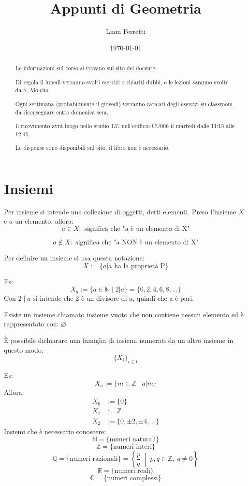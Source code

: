 \documentclass[a4paper,12pt]{article}
\title{Appunti di Geometria}
\author{Liam Ferretti}
\date{\today}
\begin{document}
	
	\maketitle
	
	\begin{abstract}
		Le informazioni sul corso si trovano sul \hyperlink{https://sites.google.com/uniroma1.it/kieranogrady}{sito del docente}.
		
		Di regola il lunedì verranno svolti esercizi o chiariti dubbi, e le lezioni saranno svolte da S. Molcho.
		
		Ogni settimana (probabilmente il giovedì) verranno caricati degli esercizi su classroom da riconsegnare entro domenica sera.
		
		Il ricevimento avrà luogo nello studio 137 nell'edificio CU006 il martedì dalle 11:15 alle 12:45.
		
		Le dispense sono disponibili sul sito, il libro non è necessario.
	\end{abstract}
		
	\newpage
	\tableofcontents
	\clearpage
	
	\section{Insiemi}
	Per insieme si intende una collezione di oggetti, detti elementi.
	Preso l'insieme $X$ e $a$ un elemento, allora:
	\[
	a \in X: \text{ significa che "a è un elemento di X"}
	\]
	
	\[
	a \not \in X: \text{ significa che "a NON è un elemento di X"}
	\]
	
	Per definire un insieme si usa questa notazione:
	\[
	X := \{a | a \text{ ha la proprietà P}\}
	\]
	
	Es: 
	\[
		X_a := \{a \in \mathbb{N} \mid 2 | a\} = \{0, 2, 4, 6, 8, ...\}
	\]
	Con $2 \mid a$ si intende che 2 è un divisore di a, quindi che a è pari.\newline
	
	Esiste un insieme chiamato insieme vuoto che non contiene nessun elemento ed è rappresentato con: $\varnothing$ \newline
	
	È possibile dichiarare una famiglia di insiemi numerati da un altro insieme in questo modo:
	\[
	\{X_i\}_{i \in I}
	\]
	
	Es: 
	\[
	X_a := \{m \in \mathbb{Z} \mid a | m\}
	\]
	Allora:
	\begin{align*}
		X_0 &:= \{0\} \\
		X_1 &:= \mathbb{Z} \\
		X_2 &:= \{0, \pm 2, \pm 4, ...\}
	\end{align*}
	\newline	
	Insiemi che è necessario conoscere:
	\[
		\mathbb{N} = \{ \text{numeri naturali} \}
	\]
	\[
		\mathbb{Z} = \{ \text{numeri interi} \}
	\]
	\[
		\mathbb{Q} = \{ \text{numeri razionali} \} = \left\{ \frac{p}{q} \;\middle|\; p,q \in \mathbb{Z}, \; q \neq 0 \right\}
	\]
	\[
		\mathbb{R} = \{ \text{numeri reali} \}
	\]
	\[
		\mathbb{C} = \{ \text{numeri complessi} \}
	\]
	
\end{document}
